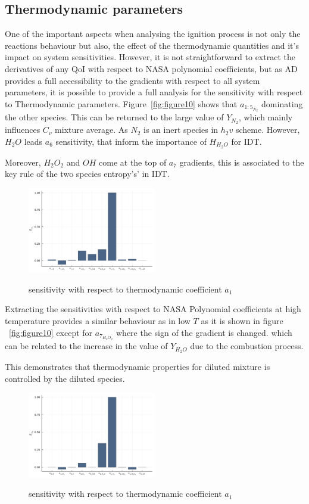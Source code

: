 \documentclass[preprint,review,12pt]{elsarticle}
\begin{document}
\subsection{Thermodynamic parameters}
One of the important aspects when analysing the ignition process is not only the reactions behaviour but also, the effect of the thermodynamic quantities and it's impact on system sensitivities. However, it is not straightforward to extract the derivatives of any QoI with respect to NASA polynomial coefficients, but as AD provides a full accessibility to the gradients with respect to all system parameters, it is possible to provide a full analysis for the sensitivity with respect to Thermodynamic parameters. 
Figure~\ref{fig:figure10} 
shows that $a_{1:5_{N_2}}$ dominating the other species. This can be returned to the large value of $Y_{N_2}$, which mainly influences $C_v$ mixture average. As $N_2$ is an inert species in $h_2v$ scheme. However, $H_2O$  leads $a_6$ sensitivity, that inform the importance of $H_{H_2O}$ for IDT.


Moreover, $H_2O_2$ and $OH$ come at the top of $a_7$ gradients, this is associated to the key rule of  the two species entropy's' in IDT.

\begin{figure}
\centering
 {\includegraphics[width=0.5\textwidth]{figures/a1.pdf}}
\caption{sensitivity with respect to thermodynamic coefficient $a_1$}
    \label{fig:figure7}
\end{figure}

Extracting the sensitivities with respect to NASA Polynomial coefficients at high temperature provides a similar behaviour as in low $T$ as it is shown in figure ~\ref{fig:figure10} except for $ a_{7_{H_2O_2}}$ where the sign of the gradient is changed.
 which can be related to the increase in the value of $Y_{H_2O}$ due to the combustion process.

 This demonstrates that  thermodynamic properties for diluted mixture is controlled by the diluted species.  
 

\begin{figure}
\centering
 {\includegraphics[width=0.5\textwidth]{figures/aa2.pdf}}
\caption{sensitivity with respect to thermodynamic coefficient $a_1$}
    \label{fig:figure8}
\end{figure}
\end{document}
